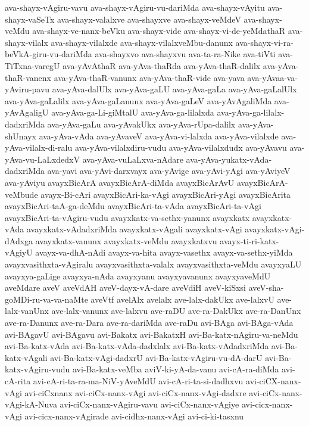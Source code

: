 {ava-shayx-vAgiru-vavu
ava-shayx-vAgiru-vu-dariMda
ava-shayx-vAyitu
ava-shayx-vaSeTx
ava-shayx-valalxve
ava-shayxve
ava-shayx-veMdeV
ava-shayx-veMdu
ava-shayx-ve-nanx-beVku
ava-shayx-vide
ava-shayx-vi-de-yeMdathaR
ava-shayx-vilalx
ava-shayx-vilalxde
ava-shayx-vilalxveMbu-danunx
ava-shayx-vi-ra-beVkA-giru-vu-dariMda
ava-shayxvo
ava-shayxvu
ava-ta-ra-Nike
ava-tiVti
ava-TiTxna-varegU
ava-yAvAthaR
ava-yAva-thaRda
ava-yAva-thaR-dalilx
ava-yAva-thaR-vanenx
ava-yAva-thaR-vanunx
ava-yAva-thaR-vide
ava-yava
ava-yAvaa-va-yAviru-pavu
ava-yAva-dalUlx
ava-yAva-gaLU
ava-yAva-gaLa
ava-yAva-gaLalUlx
ava-yAva-gaLalilx
ava-yAva-gaLanunx
ava-yAva-gaLeV
ava-yAvAgaliMda
ava-yAvAgaligU
ava-yAva-ga-Li-giMtalU
ava-yAva-ga-lilalxda
ava-yAva-ga-lilalx-dadxriMda
ava-yAva-gaLu
ava-yAvakUkx
ava-yAva-rUpa-dalilx
ava-yAva-shUnayx
ava-yAva-vAda
ava-yAvaveV
ava-yAva-vi-lalxda
ava-yAva-vilalxde
ava-yAva-vilalx-di-ralu
ava-yAva-vilalxdiru-vudu
ava-yAva-vilalxdudx
ava-yAvavu
ava-yAva-vu-LaLxdedxV
ava-yAva-vuLaLxva-nAdare
ava-yAva-yukatx-vAda-dadxriMda
ava-yavi
ava-yAvi-darxvayx
ava-yAvige
ava-yAvi-yAgi
ava-yAviyeV
ava-yAviyu
avayxBicArA
avayxBicArA-diMda
avayxBicArAvU
avayxBicArA-veMbude
avayx-Bi-cAri
avayxBicAri-ka-vAgi
avayxBicAri-yAgi
avayxBicArita
avayxBicAri-taA-ga-deMdu
avayxBicAri-ta-vAda
avayxBicAri-ta-vAgi
avayxBicAri-ta-vAgiru-vudu
avayxkatx-va-sethx-yanunx
avayxkatx
avayxkatx-vAda
avayxkatx-vAdadxriMda
avayxkatx-vAgali
avayxkatx-vAgi
avayxkatx-vAgi-dAdxga
avayxkatx-vanunx
avayxkatx-veMdu
avayxkatxvu
avayx-ti-ri-katx-vAgiyU
avayx-va-dhA-nAdi
avayx-va-hita
avayx-vasethx
avayx-va-sethx-yiMda
avayxvasithxta-vAgiralu
avayxvasithxta-valalx
avayxvasithxta-veMdu
avayxyaLU
avayxya-gaLige
avayxya-nAda
avayxyanu
avayxyavanunx
avayxyaveMdU
aveMdare
aveV
aveVdAH
aveV-dayx-vA-dare
aveVdiH
aveV-kiSxsi
aveV-sha-goMDi-ru-va-va-naMte
aveVtf
avelAlx
avelalx
ave-lalx-dakUkx
ave-lalxvU
ave-lalx-vanUnx
ave-lalx-vanunx
ave-lalxvu
ave-raDU
ave-ra-DakUkx
ave-ra-DanUnx
ave-ra-Danunx
ave-ra-Dara
ave-ra-dariMda
ave-raDu
avi-BAga
avi-BAga-vAda
avi-BAgavU
avi-BAgavu
avi-Bakatx
avi-BakatxH
avi-Ba-katx-nAgiru-va-neMdu
avi-Ba-katx-vAda
avi-Ba-katx-vAda-dadxlalx
avi-Ba-katx-vAdadxriMda
avi-Ba-katx-vAgali
avi-Ba-katx-vAgi-dadxrU
avi-Ba-katx-vAgiru-vu-dA-darU
avi-Ba-katx-vAgiru-vudu
avi-Ba-katx-veMba
aviV-ki-yA-da-vanu
avi-cA-ra-diMda
avi-cA-rita
avi-cA-ri-ta-ra-ma-NiV-yAveMdU
avi-cA-ri-ta-si-dadhxvu
avi-ciCX-nanx-vAgi
avi-ciCxnanx
avi-ciCx-nanx-vAgi
avi-ciCx-nanx-vAgi-dadxre
avi-ciCx-nanx-vAgi-kA-Nuva
avi-ciCx-nanx-vAgiru-vavu
avi-ciCx-nanx-vAgiye
avi-cicx-nanx-vAgi
avi-cicx-nanx-vAgirade
avi-cidhx-nanx-vAgi
avi-ci-ki-tasxnu
}
